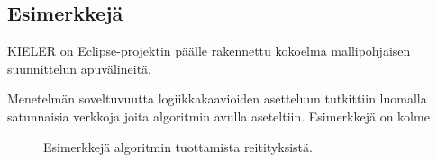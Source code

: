 \documentclass[finnish,12pt]{article}
\begin{document}
		\subsection{Esimerkkejä}

KIELER on Eclipse-projektin päälle rakennettu kokoelma mallipohjaisen suunnittelun apuvälineitä.

Menetelmän soveltuvuutta logiikkakaavioiden asetteluun tutkittiin luomalla satunnaisia verkkoja joita algoritmin avulla aseteltiin.
Esimerkkejä on kolme

\begin{figure}[ht]

\centering
{}



\caption{Esimerkkejä algoritmin tuottamista reitityksistä. }
\end{figure}
\end{document}
